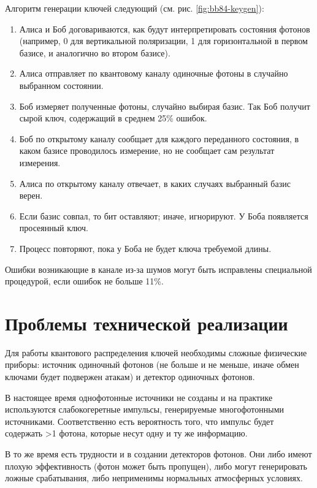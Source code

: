 \documentclass[a4paper,14pt]{extarticle}
\begin{document}
Алгоритм генерации ключей следующий (см. рис. \ref{fig:bb84-keygen}):
\begin{enumerate}
    \item Алиса и Боб договариваются, как будут интерпретировать состояния
        фотонов (например, 0 для вертикальной поляризации, 1 для горизонтальной
        в первом базисе, и аналогично во втором базисе).
    \item Алиса отправляет по квантовому каналу одиночные фотоны в случайно
        выбранном состоянии.
    \item Боб измеряет полученные фотоны, случайно выбирая базис. Так Боб
        получит сырой ключ, содержащий в среднем 25\% ошибок.
    \item Боб по открытому каналу сообщает для каждого переданного
        состояния, в каком базисе проводилось измерение, но не сообщает сам
        результат измерения.
    \item Алиса по открытому каналу отвечает, в каких случаях выбранный базис
        верен.
    \item Если базис совпал, то бит оставляют; иначе, игнорируют. У Боба
        появляется просеянный ключ.
    \item Процесс повторяют, пока у Боба не будет ключа требуемой длины.
\end{enumerate}


Ошибки возникающие в канале из-за шумов могут быть исправлены специальной
процедурой, если ошибок не больше 11\%.

\section{Проблемы технической реализации}

Для работы квантового распределения ключей необходимы сложные физические
приборы: источник одиночный фотонов (не больше и не меньше, иначе обмен ключами
будет подвержен атакам) и детектор одиночных фотонов.

В настоящее время однофотонные источники не созданы и на практике используются
слабокогеретные импульсы, генерируемые многофотонными источниками.
Соответственно есть вероятность того, что импульс будет содержать >1 фотона,
которые несут одну и ту же информацию.

В то же время есть трудности и в создании детекторов фотонов. Они либо имеют
плохую эффективность (фотон может быть пропущен), либо могут генерировать
ложные срабатывания, либо неприменимы нормальных атмосферных условиях.
\end{document}

